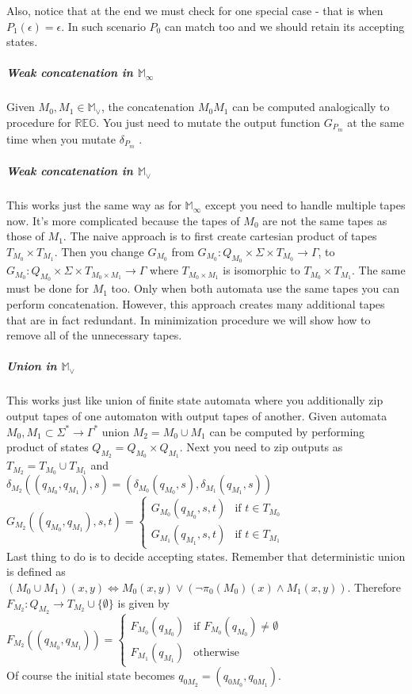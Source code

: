 \documentclass[12pt]{article}
\begin{document}
Also, notice that at the end we must check for one special case - that is when $P_1(\epsilon)=\epsilon$. In such scenario $P_0$ can match too and we should retain its accepting states.
\subparagraph{Weak concatenation in $\mathbb{M}_\infty$} Given $M_0,M_1 \in \mathbb{M}_\vee$, the concatenation $M_0M_1$ can be computed analogically to procedure for $\mathbb{ REG}$. You just need to mutate the output function $G_{P_m}$ at the same time when you mutate $\delta_{P_m}$ . 

\subparagraph{Weak concatenation in $\mathbb{M}_\vee$} This works just the same way as for $\mathbb{M}_\infty$ except you need to handle multiple tapes now. It's more complicated because the tapes of $M_0$ are not the same tapes as those of $M_1$. The naive approach is to first create cartesian product of tapes $T_{M_0} \times T_{M_1}$. Then you change $G_{M_0}$ from $G_{M_0} : Q_{M_0} \times \Sigma \times T_{M_0} \rightarrow \Gamma$, to $G_{M_0} : Q_{M_0} \times \Sigma \times T_{M_0 \times M_1} \rightarrow \Gamma$ where $T_{M_0 \times M_1}$ is isomorphic to $T_{M_0} \times T_{M_1}$. The same must be done for $M_1$ too. Only when both automata use the same tapes you can perform concatenation. However, this approach creates many additional tapes that are in fact redundant. In minimization procedure we  will show how to remove all of the unnecessary tapes.

\subparagraph{Union in $\mathbb{M}_\vee$}  This works just like union of finite state automata where you additionally zip output tapes of one automaton with output tapes of another. Given automata $M_0,M_1 \subset \Sigma^* \rightarrow \Gamma^*$ union $M_2=M_0 \cup M_1$ can be computed by performing product of states $Q_{M_2} = Q_{M_0} \times Q_{M_1}$. Next you need to zip outputs as $T_{M_2} = T_{M_0} \cup T_{M_1}$  and \\
$\delta_{M_2}((q_{M_0},q_{M_1}),s) = 
(\delta_{M_0}(q_{M_0},s),\delta_{M_1}(q_{M_1},s))$ \\
$G_{M_2}((q_{M_0},q_{M_1}),s,t) = \begin{cases}
G_{M_0}(q_{M_0},s,t)  & \mbox{if }  t \in T_{M_0} \\
G_{M_1}(q_{M_1},s,t)  & \mbox{if }  t \in T_{M_1}
\end{cases}$\\
Last thing to do is to decide accepting states. Remember that deterministic union is defined as $(M_0 \cup M_1)(x,y) \iff M_0(x,y) \vee (\neg \pi_0(M_0)(x) \wedge M_1(x,y))$. Therefore $F_{M_2} : Q_{M_2}  \rightarrow T_{M_2} \cup \{\emptyset\}$ is given by \\
$F_{M_2}((q_{M_0},q_{M_1})) = \begin{cases}
F_{M_0}(q_{M_0})  & \mbox{if }  F_{M_0}(q_{M_0}) \ne \emptyset  \\
F_{M_1}(q_{M_1})  & \mbox{otherwise} 
\end{cases} $ \\
Of course the initial state becomes $q_{0M_2}=(q_{0M_0},q_{0M_1})$.
\end{document}
